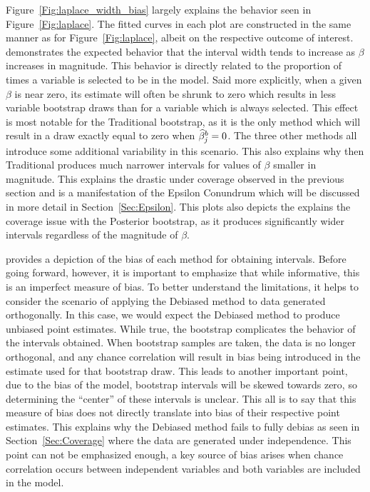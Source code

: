 Figure~\ref{Fig:laplace_width_bias} largely explains the behavior seen in Figure~\ref{Fig:laplace}. The fitted curves in each plot are constructed in the same manner as for Figure~\ref{Fig:laplace}, albeit on the respective outcome of interest.  demonstrates the expected behavior that the interval width tends to increase as $\beta$ increases in magnitude. This behavior is directly related to the proportion of times a variable is selected to be in the model. Said more explicitly, when a given $\beta$ is near zero, its estimate will often be shrunk to zero which results in less variable bootstrap draws than for a variable which is always selected. This effect is most notable for the Traditional bootstrap, as it is the only method which will result in a draw exactly equal to zero when $\widehat{\beta}^b_j = 0$. The three other methods all introduce some additional variability in this scenario. This also explains why then Traditional produces much narrower intervals for values of $\beta$ smaller in magnitude. This explains the drastic under coverage observed in the previous section and is a manifestation of the Epsilon Conundrum which will be discussed in more detail in Section~\ref{Sec:Epsilon}. This plots also depicts the explains the coverage issue with the Posterior bootstrap, as it produces significantly wider intervals regardless of the magnitude of $\beta$.

 provides a depiction of the bias of each method for obtaining intervals. Before going forward, however, it is important to emphasize that while informative, this is an imperfect measure of bias. To better understand the limitations, it helps to consider the scenario of applying the Debiased method to data generated orthogonally. In this case, we would expect the Debiased method to produce unbiased point estimates. While true, the bootstrap complicates the behavior of the intervals obtained. When bootstrap samples are taken, the data is no longer orthogonal, and any chance correlation will result in bias being introduced in the estimate used for that bootstrap draw. This leads to another important point, due to the bias of the model, bootstrap intervals will be skewed towards zero, so determining the ``center'' of these intervals is unclear. This all is to say that this measure of bias does not directly translate into bias of their respective point estimates. This explains why the Debiased method fails to fully debias as seen in Section~\ref{Sec:Coverage} where the data are generated under independence. This point can not be emphasized enough, a key source of bias arises when chance correlation occurs between independent variables and both variables are included in the model.

